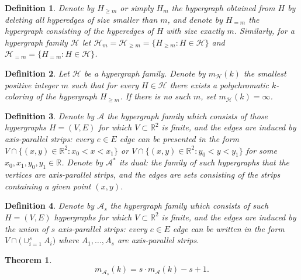 \documentclass[10pt,a4paper]{amsart}
\newcommand{\R}{\mathbb{R}}
\newcommand{\HH}{\mathcal{H}}
\newcommand{\A}{\mathcal{A}}
\newtheorem{theorem}{Theorem}
\newtheorem{definition}{Definition}
\begin{document}
\begin{definition} Denote by $H_{\ge m}$ or simply $H_m$ the hypergraph obtained from $H$ by deleting all hyperedges of size smaller than $m$, and denote by $H_{=m}$ the hypergraph consisting of the hyperedges of $H$ with size exactly $m$. Similarly, for a hypergraph family $\mathcal{H}$ let $\HH_m=\HH_{\ge m}=\{H_{\ge m}:H\in\HH\}$ and $\HH_{=m}=\{H_{=m}:H\in\HH\}$.
\end{definition}

\begin{definition} Let $\mathcal{H}$ be a hypergraph family. Denote by $m_\mathcal{H}(k)$ the smallest positive integer $m$ such that for every $H\in\mathcal{H}$ there exists a polychromatic $k$-coloring of the hypergraph $H_{\ge m}$. If there is no such $m$, set $m_{\mathcal{H}}(k)=\infty$.
\end{definition}

\begin{definition} Denote by $\A$ the hypergraph family which consists of those hypergraphs $H=(V,E)$ for which $V\subset \R^2$ is finite, and the edges are induced by axis-parallel strips: every $e\in E$ edge can be presented in the form $V\cap\{(x,y)\in\R^2: x_0<x<x_1\}$ or $V\cap\{(x,y)\in\R^2: y_0<y<y_1\}$ for some $x_0, x_1, y_0, y_1 \in\R$. Denote by $\A^*$ its dual: the family of such hypergraphs that the vertices are axis-parallel strips, and the edges are sets consisting of the strips containing a given point $(x,y)$. 
\end{definition}

\begin{definition} Denote by $\A_s$ the hypergraph family which consists of such $H=(V,E)$ hypergraphs for which $V\subset \R^2$ is finite, and the edges are induced by the union of $s$ axis-parallel strips: every $e\in E$ edge can be written in the form $V\cap \Big(\cup_{i=1}^s A_i\Big)$ where $A_1,\ldots, A_s$ are axis-parallel strips. 
\end{definition}

\begin{theorem}\label{s_strip}
$$m_{\A_s}(k)=s \cdot m_\A(k)-s+1.$$
\end{theorem}
\end{document}
